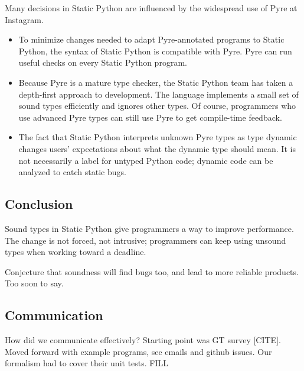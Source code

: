 \documentclass[english,cleveref,submission]{programming}
\newcommand{\SP}{Static Python}
\begin{document}
Many decisions in \SP{} are influenced by the widespread use of Pyre at Instagram.
\begin{itemize}
  \item
    To minimize changes needed to adapt Pyre-annotated programs
    to \SP{}, the syntax of \SP{} is compatible with Pyre.
    Pyre can run useful checks on every \SP{} program.
  \item
    Because Pyre is a mature type checker, the \SP{} team has taken a
    depth-first approach to development.
    The language implements a small set of sound types efficiently and ignores
    other types.
    Of course, programmers who use advanced Pyre types can still use Pyre to
    get compile-time feedback.
  \item
    The fact that \SP{} interprets unknown Pyre types as type dynamic changes
    users' expectations about what the dynamic type should mean.
    It is not necessarily a label for untyped Python code; dynamic code
    can be analyzed to catch static bugs.
\end{itemize}


\subsection{Conclusion}

Sound types in Static Python give programmers a way to improve performance.
The change is not forced, not intrusive;
programmers can keep using unsound types when working toward a deadline.

Conjecture that soundness will find bugs too, and lead to more reliable products.
Too soon to say.


\subsection{Communication}

How did we communicate effectively?
Starting point was GT survey [CITE].
Moved forward with example programs, see emails and github issues.
Our formalism had to cover their unit tests.
FILL

\end{document}
